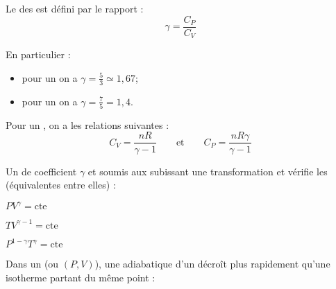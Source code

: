 \begin{definition}
Le  des  est défini par le rapport :
\[\gamma = \frac{C_P}{C_V}\]
\end{definition}

\begin{remarque}
En particulier :
\begin{itemize}
\item pour un  on a $\gamma = \frac{5}{3} \simeq 1,67$;
\item pour un  on a $\gamma = \frac{7}{5} = 1,4$.
\end{itemize}
\end{remarque}

\begin{propriete}
Pour un , on a les relations suivantes :
\[C_V = \frac{nR}{\gamma - 1} \qquad \text{et} \qquad C_P = \frac{nR \gamma}{\gamma - 1}\]
\end{propriete}

\begin{theoreme}
Un  de coefficient $\gamma$  et soumis aux  subissant une transformation  et  vérifie les  (équivalentes entre elles) :

\begin{center}
\begin{enumerate*}[label=(\roman*), itemjoin=\qquad]
\item $PV^{\gamma} = \text{cte}$
\item $TV^{\gamma - 1} = \text{cte}$
\item $P^{1 - \gamma} T^{\gamma} = \text{cte}$
\end{enumerate*}
\end{center}
\end{theoreme}

\begin{propriete}
Dans un  (ou $(P, V)$), une adiabatique  d'un  décroît plus rapidement qu'une isotherme partant du même point :

\begin{figure}[H]
\begin{center}
\end{center}
\end{figure}
\end{propriete}



